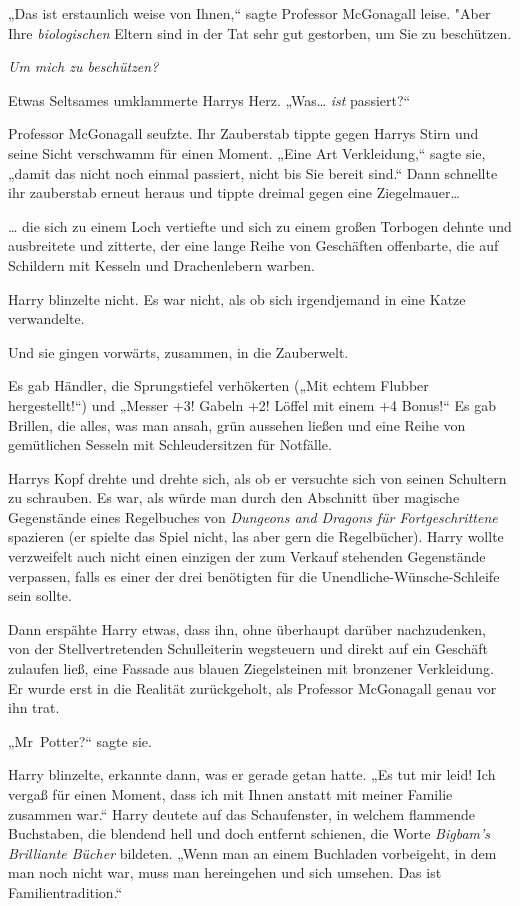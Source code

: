 {„Das ist erstaunlich weise von Ihnen,“ sagte Professor McGonagall leise. "Aber Ihre \emph{biologischen} Eltern sind in der Tat sehr gut gestorben, um Sie zu beschützen.

\emph{Um mich zu beschützen?}

Etwas Seltsames umklammerte Harrys Herz. „Was… \emph{ist} passiert?“

Professor McGonagall seufzte. Ihr Zauberstab tippte gegen Harrys Stirn und seine Sicht verschwamm für einen Moment. „Eine Art Verkleidung,“ sagte sie, „damit das nicht noch einmal passiert, nicht bis Sie bereit sind.“ Dann schnellte ihr zauberstab erneut heraus und tippte dreimal gegen eine Ziegelmauer…

… die sich zu einem Loch vertiefte und sich zu einem großen Torbogen dehnte und ausbreitete und zitterte, der eine lange Reihe von Geschäften offenbarte, die auf Schildern mit Kesseln und Drachenlebern warben.

Harry blinzelte nicht. Es war nicht, als ob sich irgendjemand in eine Katze verwandelte.

Und sie gingen vorwärts, zusammen, in die Zauberwelt.

Es gab Händler, die Sprungstiefel verhökerten („Mit echtem Flubber hergestellt!“) und „Messer +3! Gabeln +2! Löffel mit einem +4 Bonus!“ Es gab Brillen, die alles, was man ansah, grün aussehen ließen und eine Reihe von gemütlichen Sesseln mit Schleudersitzen für Notfälle.

Harrys Kopf drehte und drehte sich, als ob er versuchte sich von seinen Schultern zu schrauben. Es war, als würde man durch den Abschnitt über magische Gegenstände eines Regelbuches von \emph{Dungeons and Dragons für Fortgeschrittene} spazieren (er spielte das Spiel nicht, las aber gern die Regelbücher). Harry wollte verzweifelt auch nicht einen einzigen der zum Verkauf stehenden Gegenstände verpassen, falls es einer der drei benötigten für die Unendliche-Wünsche-Schleife sein sollte.

Dann erspähte Harry etwas, dass ihn, ohne überhaupt darüber nachzudenken, von der Stellvertretenden Schulleiterin wegsteuern und direkt auf ein Geschäft zulaufen ließ, eine Fassade aus blauen Ziegelsteinen mit bronzener Verkleidung. Er wurde erst in die Realität zurückgeholt, als Professor McGonagall genau vor ihn trat.

„Mr~Potter?“ sagte sie.

Harry blinzelte, erkannte dann, was er gerade getan hatte. „Es tut mir leid! Ich vergaß für einen Moment, dass ich mit Ihnen anstatt mit meiner Familie zusammen war.“ Harry deutete auf das Schaufenster, in welchem flammende Buchstaben, die blendend hell und doch entfernt schienen, die Worte \emph{Bigbam's Brilliante Bücher} bildeten. „Wenn man an einem Buchladen vorbeigeht, in dem man noch nicht war, muss man hereingehen und sich umsehen. Das ist Familientradition.“

}
